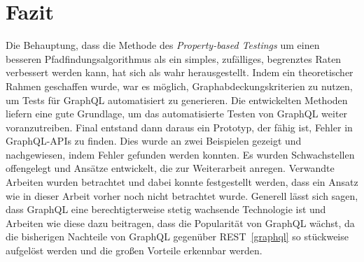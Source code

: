 \chapter{Fazit}
\label{fazit}

Die Behauptung, dass die Methode des \textit{Property-based Testings} um einen besseren Pfadfindungsalgorithmus als ein simples, zufälliges, begrenztes Raten verbessert werden kann, hat sich als wahr herausgestellt.
Indem ein theoretischer Rahmen geschaffen wurde, war es möglich, Graphabdeckungskriterien zu nutzen, um Tests für GraphQL automatisiert zu generieren.
Die entwickelten Methoden liefern eine gute Grundlage, um das automatisierte Testen von GraphQL weiter voranzutreiben.
Final entstand dann daraus ein Prototyp, der fähig ist, Fehler in GraphQL-APIs zu finden.
Dies wurde an zwei Beispielen gezeigt und nachgewiesen, indem Fehler gefunden werden konnten.
Es wurden Schwachstellen offengelegt und Ansätze entwickelt, die zur Weiterarbeit anregen.
Verwandte Arbeiten wurden betrachtet und dabei konnte festgestellt werden, dass ein Ansatz wie in dieser Arbeit vorher noch nicht betrachtet wurde.
Generell lässt sich sagen, dass GraphQL eine berechtigterweise stetig wachsende Technologie ist und Arbeiten wie diese
dazu beitragen, dass die Popularität von GraphQL wächst, da die bisherigen Nachteile von GraphQL gegenüber REST~\ref{graphql} so stückweise aufgelöst werden
und die großen Vorteile erkennbar werden.


